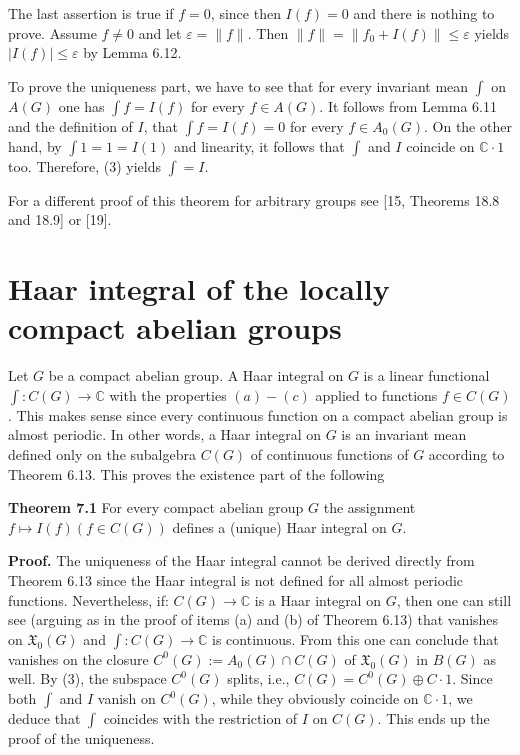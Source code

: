 \documentclass[12pt]{article}
\begin{document}
    The last assertion is true if $f = 0$, since then $I(f ) = 0$ and there is nothing to prove. Assume $f \neq 0$ and let $\varepsilon = \| f \|$.
Then $\| f \|=\| f_0 + I(f )\| \leqslant \varepsilon$ yields $|I(f )| \leqslant \varepsilon$ by Lemma 6.12.


    To prove the uniqueness part, we have to see that for every invariant mean $\int$ on $A(G)$ one has $\int f = I(f )$ for every
$f \in A(G)$. It follows from Lemma 6.11 and the definition of $I$, that $\int f = I(f ) = 0$ for every $f \in A_0(G)$. On the other hand,
by $\int 1 = 1 = I(1)$ and linearity, it follows that $\int$ and $I$ coincide on $\mathbb{C} \cdot 1$ too. Therefore, (3) yields $\int = I$.


    For a different proof of this theorem for arbitrary groups see [15, Theorems 18.8 and 18.9] or [19].


\section{Haar integral of the locally compact abelian groups}


    Let $G$ be a compact abelian group. A Haar integral on $G$ is a linear functional $\int : C(G) \to \mathbb{C}$ with the properties $(a)-(c)$
applied to functions $f \in C(G)$. This makes sense since every continuous function on a compact abelian group is almost
periodic. In other words, a Haar integral on $G$ is an invariant mean defined only on the subalgebra $C(G)$ of continuous
functions of $G$ according to Theorem 6.13. This proves the existence part of the following


\textbf{Theorem 7.1} For every compact abelian group $G$ the assignment $f \mapsto I(f ) (f \in C(G))$ defines a (unique) Haar integral on $G$.


\textbf{Proof.} The uniqueness of the Haar integral cannot be derived directly from Theorem 6.13 since the Haar integral is not
defined for all almost periodic functions. Nevertheless, if: $C(G) \to \mathbb{C}$ is a Haar integral on $G$, then one can still see
(arguing as in the proof of items (a) and (b) of Theorem 6.13) that  vanishes on $\mathfrak{X}_0(G)$ and $\int : C(G) \to \mathbb{C}$ is continuous.
From this one can conclude that  vanishes on the closure $C^0(G) := A_0(G) \cap C(G)$ of $\mathfrak{X}_0(G)$ in $B(G)$ as well. By (3), the
subspace $C^0(G)$ splits, i.e., $C(G) = C^0(G) \oplus C \cdot 1$. Since both $\int$ and $I$ vanish on $C^0(G)$, while they obviously coincide on $\mathbb{C} \cdot 1$,
we deduce that $\int$ coincides with the restriction of $I$ on $C(G)$. This ends up the proof of the uniqueness.
\end{document}
